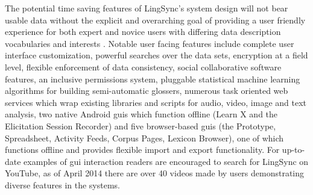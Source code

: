 \documentclass[11pt]{article}
\newcommand{\smalltodo}[2][]
    {\todo[caption={#2}, #1]
    {\tiny#2\normalsize}}
\begin{document}
The potential time saving features of LingSync's system design will not bear
usable data without the explicit and overarching goal of providing a user
friendly experience for both expert and novice users with differing data description vocabularies and interests \cite{Troy:2014}.  Notable user facing
features include complete user interface customization, powerful searches over the data sets, encryption at a field
level, flexible enforcement of data consistency, social collaborative software
features, an inclusive permissions system, pluggable statistical machine
learning algorithms for building semi-automatic glossers, numerous task
oriented web services which wrap existing libraries and scripts for audio,
video, image and text analysis, two native Android \glspl{gui} which function
offline (Learn X and the Elicitation Session Recorder) and five browser-based
\glspl{gui} (the Prototype, Spreadsheet,  Activity Feeds, Corpus Pages, 
Lexicon Browser), one of which functions offline and provides flexible import
and export functionality.  For up-to-date examples of \gls{gui} interaction
readers are encouraged to search for LingSync on YouTube, as of April 2014
there are over 40 videos made by users demonstrating diverse features in the
systems.

\end{document}
